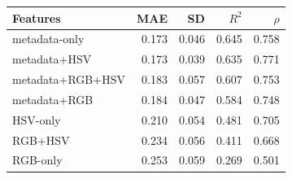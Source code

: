 \begin{tabular}{lrrrr}
\toprule
Features & MAE & SD & $R^2$ & $\rho$ \\
\midrule
metadata-only & 0.173 & 0.046 & 0.645 & 0.758 \\
metadata+HSV & 0.173 & 0.039 & 0.635 & 0.771 \\
metadata+RGB+HSV & 0.183 & 0.057 & 0.607 & 0.753 \\
metadata+RGB & 0.184 & 0.047 & 0.584 & 0.748 \\
HSV-only & 0.210 & 0.054 & 0.481 & 0.705 \\
RGB+HSV & 0.234 & 0.056 & 0.411 & 0.668 \\
RGB-only & 0.253 & 0.059 & 0.269 & 0.501 \\
\bottomrule
\end{tabular}
